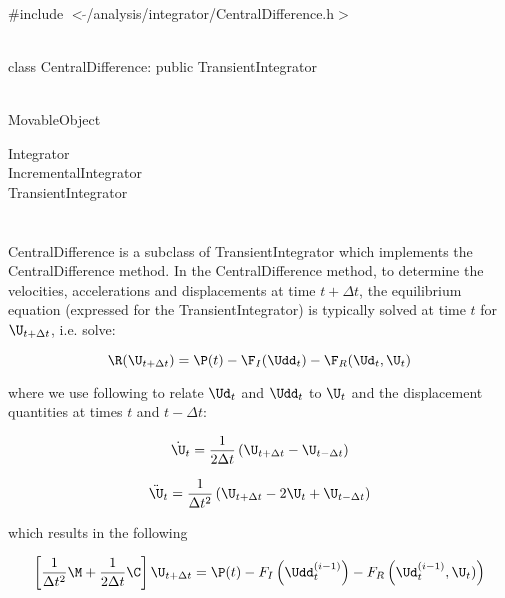 
   \\
\#include $<\tilde{ }$/analysis/integrator/CentralDifference.h$>$  


  \\
class CentralDifference: public TransientIntegrator  


 \\
MovableObject 

\indent\indent Integrator \\
\indent\indent\indent IncrementalIntegrator \\
\indent\indent\indent\indent TransientIntegrator \\
\indent\indent\indent\indent{} \\

 \\ 
\indent CentralDifference is a subclass of TransientIntegrator which implements
the CentralDifference method. In the CentralDifference method, to determine the
velocities, accelerations and displacements at time $t + \Delta t$,
the equilibrium equation (expressed for the TransientIntegrator) is
typically solved at time $t$ for $\U_{t+\Delta t}$, i.e. solve: 

\[ \R (\U_{t+ \Delta t}) = \P(t) - \F_I(\Udd_{t})
- \F_R(\Ud_{t},\U_{t}) \]

\noindent where we use following to relate $\Ud_{t}$ and $\Udd_{t}$ to
$\U_{t}$ and the displacement quantities at times $t$ and $t - \Delta
t$: 

\[
\dot \U_{t} = \frac{1}{2 \Delta t} \left(
\U_{t + \Delta t} -  \U_{t - \Delta t} \right)
\]

\[
\ddot \U_{t} = \frac{1}{\Delta t^2} \left(
\U_{t + \Delta t} - 2 \U_t + \U_{t - \Delta t}\right)
\]


\noindent which results in the following 

\[ \left[ \frac{1}{\Delta t^2} \M + \frac{1}{2 \Delta t}
\C \right] \U_{t + \Delta t} = \P(t) - F_I \left(\Udd_t^{(i-1)}
\right)
-F_R\left( \Ud_t^{(i-1)}, \U_t)\right) \]
\\

